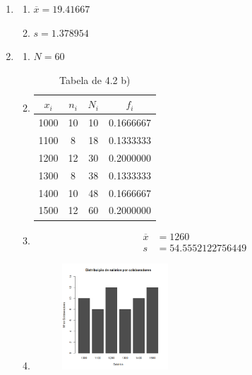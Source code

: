 \documentclass[11pt,a4paper]{report}
\begin{document}
\begin{enumerate}[label=\arabic{chapter}.\arabic*]
	\item {}
		\begin{enumerate}[label=\alph*)]
		\item $\overline{x} = 19.41667$\hfill
			
		\item $s = 1.378954$\hfill
			
		\end{enumerate}
	\item {}\hfill
		\begin{enumerate}[label=\alph*)]
		\item $N = 60$\hfill
			
		\item \hfill
			\begin{table}[h!]
				\centering
				\begin{tabular}{|c|c|c|c|}
					\hline
					$x_i$&$n_i$&$N_i$&$f_i$ \\
					\hline
					1000&10&10&0.1666667\\
					\hline
					1100& 8&18&0.1333333\\
					\hline
					1200&12&30&0.2000000\\
					\hline
					1300& 8&38&0.1333333\\
					\hline
					1400&10&48&0.1666667\\
					\hline
					1500&12&60&0.2000000\\
					\hline
				\end{tabular}
				\caption{Tabela de 4.2 b)}
			\end{table}
			
			\clearpage
		\item \hfill
			\begin{align*}
				\overline{x} &= 1260 \\
				s &= 54.5552122756449
			\end{align*}
			
		\item \hfill
			\begin{figure}[h!]
				\centering
				\includegraphics[width=0.4\textwidth]{./recursos/ex4_2d.png}

\end{figure}
\end{enumerate}
\end{enumerate}
\end{document}
